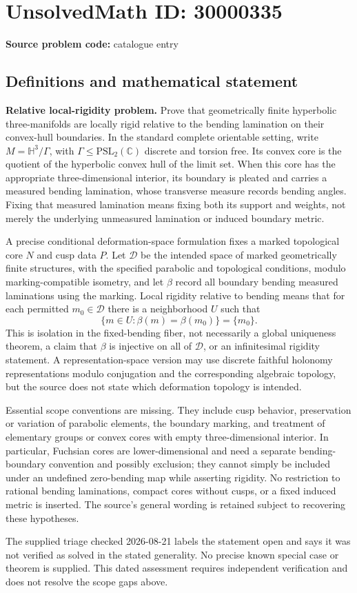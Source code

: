 \documentclass[11pt]{article}
\newcommand{\C}{\mathbb{C}}
\begin{document}
\section*{UnsolvedMath ID: 30000335}
\textbf{Source problem code:} catalogue entry
\subsection{Definitions and mathematical statement}
\textbf{Relative local-rigidity problem.} Prove that geometrically finite hyperbolic three-manifolds are locally rigid relative to the bending lamination on their convex-hull boundaries. In the standard complete orientable setting, write \(M=\mathbb H^3/\Gamma\), with \(\Gamma\le\mathrm{PSL}_2(\C)\) discrete and torsion free. Its convex core is the quotient of the hyperbolic convex hull of the limit set. When this core has the appropriate three-dimensional interior, its boundary is pleated and carries a measured bending lamination, whose transverse measure records bending angles. Fixing that measured lamination means fixing both its support and weights, not merely the underlying unmeasured lamination or induced boundary metric.\par A precise conditional deformation-space formulation fixes a marked topological core \(N\) and cusp data \(P\). Let \(\mathcal D\) be the intended space of marked geometrically finite structures, with the specified parabolic and topological conditions, modulo marking-compatible isometry, and let \(\beta\) record all boundary bending measured laminations using the marking. Local rigidity relative to bending means that for each permitted \(m_0\in\mathcal D\) there is a neighborhood \(U\) such that\[\{m\in U:\beta(m)=\beta(m_0)\}=\{m_0\}.\] This is isolation in the fixed-bending fiber, not necessarily a global uniqueness theorem, a claim that \(\beta\) is injective on all of \(\mathcal D\), or an infinitesimal rigidity statement. A representation-space version may use discrete faithful holonomy representations modulo conjugation and the corresponding algebraic topology, but the source does not state which deformation topology is intended.\par Essential scope conventions are missing. They include cusp behavior, preservation or variation of parabolic elements, the boundary marking, and treatment of elementary groups or convex cores with empty three-dimensional interior. In particular, Fuchsian cores are lower-dimensional and need a separate bending-boundary convention and possibly exclusion; they cannot simply be included under an undefined zero-bending map while asserting rigidity. No restriction to rational bending laminations, compact cores without cusps, or a fixed induced metric is inserted. The source's general wording is retained subject to recovering these hypotheses.\par The supplied triage checked 2026-08-21 labels the statement open and says it was not verified as solved in the stated generality. No precise known special case or theorem is supplied. This dated assessment requires independent verification and does not resolve the scope gaps above.
\end{document}
